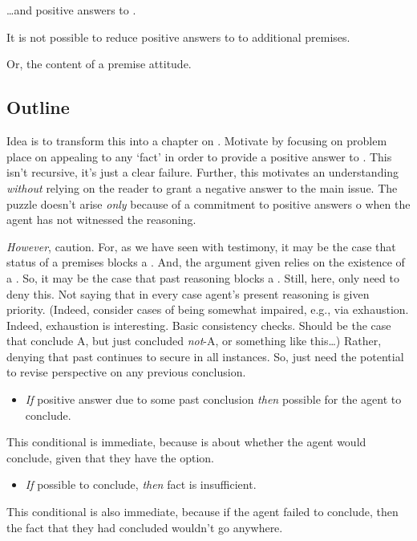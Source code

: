 \chapter{}
\label{cha:foregone-conclusions}

\begin{note}
  \dots and positive answers to \qzS{}.
\end{note}

\begin{note}
  It is not possible to reduce positive answers to \qzS{} to additional premises.

  Or, the content of a premise attitude.
\end{note}

\section{Outline}
\label{sec:outline}

\begin{note}
  Idea is to transform this into a chapter on \fc{}.
  Motivate \fc{} by focusing on problem  place on appealing to any `fact' in order to provide a positive answer to \qzS{}.
  This isn't recursive, it's just a clear failure.
  Further, this motivates an understanding \emph{without} relying on the reader to grant a negative answer to the main issue.
  The puzzle doesn't arise \emph{only} because of a commitment to positive answers o \qzS{} when the agent has not witnessed the reasoning.

  \emph{However}, caution.
  For, as we have seen with testimony, it may be the case that status of a premises blocks a \requ{}.
  And, the argument given relies on the existence of a \requ{}.
  So, it may be the case that past reasoning blocks a \requ{}.
  Still, here, only need to deny this.
  Not saying that in every case agent's present reasoning is given priority.
  (Indeed, consider cases of being somewhat impaired, e.g., via exhaustion.
  Indeed, exhaustion is interesting.
  Basic consistency checks.
  Should be the case that conclude A, but just concluded \emph{not}-A, or something like this\dots)
  Rather, denying that past continues to secure in all instances.
  So, just need the potential to revise perspective on any previous conclusion.
\end{note}

\begin{note}
  \begin{itemize}
  \item
    \emph{If} positive answer due to some past conclusion \emph{then} possible for the agent to conclude.
  \end{itemize}
  This conditional is immediate, because \qzS{} is about whether the agent would conclude, given that they have the option.
  \begin{itemize}
  \item
    \emph{If} possible to conclude, \emph{then} fact is insufficient.
  \end{itemize}
  This conditional is also immediate, because if the agent failed to conclude, then the fact that they had concluded wouldn't go anywhere.
\end{note}

